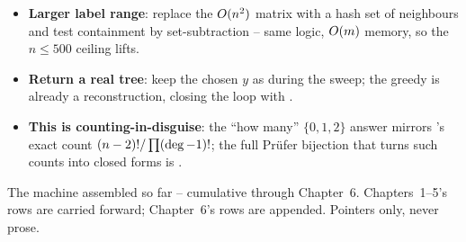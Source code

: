 \begin{hardeningbox}
\begin{itemize}[nosep, leftmargin=1.4em]
  \item \textbf{Larger label range}: replace the $O(n^2)$  matrix with a hash set of
        neighbours and test containment by set-subtraction -- same logic, $O(m)$ memory, so the
        $n\le500$ ceiling lifts.
  \item \textbf{Return a real tree}: keep the chosen $y$ as  during the sweep; the
        greedy is already a reconstruction, closing the loop with .
  \item \textbf{This is counting-in-disguise}: the ``how many'' $\{0,1,2\}$ answer mirrors
        's exact count $(n-2)!/\prod(\operatorname{deg}-1)!$; the full Pr\"ufer bijection
        that turns such counts into closed forms is .
\end{itemize}
\end{hardeningbox}


The machine assembled so far -- cumulative through Chapter~6. Chapters~1--5's rows are carried
forward; Chapter~6's rows are appended. Pointers only, never prose.

